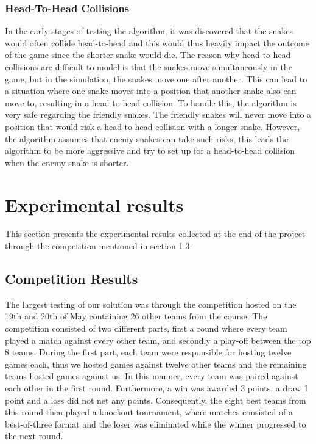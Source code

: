 \documentclass[a4paper,12pt]{article}
\begin{document}
\subsubsection{Head-To-Head Collisions} %

In the early stages of testing the algorithm, it was discovered that the snakes would often collide head-to-head and this would thus heavily impact the outcome of the game since the shorter snake would die. %
The reason why head-to-head collisions are difficult to model is that the snakes move simultaneously in the game, but in the simulation, the snakes move one after another. This can lead to a situation where one snake moves into a position that another snake also can move to, resulting in a head-to-head collision. To handle this, the algorithm is very safe regarding the friendly snakes. The friendly snakes will never move into a position that would risk a head-to-head collision with a longer snake. However, the algorithm assumes that enemy snakes can take such risks, this leads the algorithm to be more aggressive and try to set up for a head-to-head collision when the enemy snake is shorter.






\newpage
\section{Experimental results}
\label{sec:exps}

This section presents the experimental results collected at the end of the project through the competition mentioned in section 1.3.


\subsection{Competition Results}
The largest testing of our solution was through the competition hosted on the 19th and 20th of May containing 26 other teams from the course. The competition consisted of two different parts, first a round where every team played a match against every other team, and secondly a play-off between the top 8 teams. During the first part, each team were responsible for hosting twelve games each, thus we hosted games against twelve other teams and the remaining teams hosted games against us. In this manner, every team was paired against each other in the first round. Furthermore, a win was awarded 3 points, a draw 1 point and a loss did not net any points. Consequently, the eight best teams from this round then played a knockout tournament, where matches consisted of a best-of-three format and the loser was eliminated while the winner progressed to the next round. 
\end{document}

